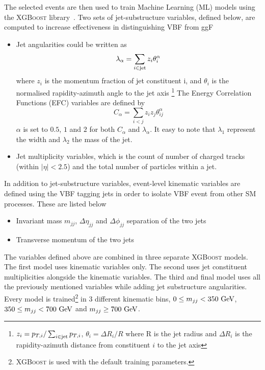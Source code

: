 \documentclass[11pt]{cernrep}
\begin{document}
The selected events are then used to train Machine Learning (ML) models using the \textsc{XGBoost} library~\cite{Chen:2016btl}. Two sets of jet-substructure variables, defined below, are computed to increase effectiveness in distinguishing VBF from ggF
\begin{itemize}
    \item Jet angularities \cite{Larkoski:2014pca} could be written as
    \begin{equation}
        \lambda_{\alpha} = \sum_{i \in \rm jet} z_i \theta_{i}^\alpha
    \end{equation}
    where $z_i$ is the momentum fraction of jet constituent i, and $\theta_i$ is the normalised rapidity-azimuth angle to the jet axis \footnote{$z_i = p_{T,i}/\sum_{i\in \rm jet} p_{T,i}$, $\theta_i = \Delta R_i/R$ where R is the jet radius and $\Delta R_i$ is the rapidity-azimuth distance from constituent $i$ to the jet axis}
    The Energy Correlation Functions (EFC) \cite{Moult:2016cvt} variables are defined by
    \begin{equation}
        C_{\alpha} = \sum_{i < j} z_i z_j \theta_{ij}^\alpha
    \end{equation}
    $\alpha$ is set to $0.5$, $1$ and $2$ for both $C_{\alpha}$ and $\lambda_{\alpha}$. It easy to note that $\lambda_1$ represent the width and $\lambda_2$ the mass of the jet.
    \item Jet multiplicity variables, which is the count of number of charged  tracks (within $|\eta|<2.5$) and the total number of particles within a jet.
\end{itemize}

In addition to jet-substructure variables, event-level kinematic variables are defined using the VBF tagging jets in order to isolate VBF event from other SM processes. These are listed below
\begin{itemize}
    \item Invariant mass $m_{jj}$, $\Delta\eta_{jj}$ and $\Delta\phi_{jj}$ separation of the two jets
    \item Transverse momentum of the two jets
\end{itemize}

The variables defined above are combined in three separate \textsc{XGBoost} models. The first model uses kinematic variables only. The second uses jet constituent multiplicities alongside the kinematic variables. The third and final model uses all the previously mentioned variables while adding jet substructure angularities. Every model is trained\footnote{\textsc{XGBoost} is used with the default training parameters.} in 3 different kinematic bins, $0\leq m_{jj}<350~\rm GeV$, $350\leq m_{jj} <700~\rm GeV$ and $m_{jj}\geq 700~\rm GeV$.
\end{document}
